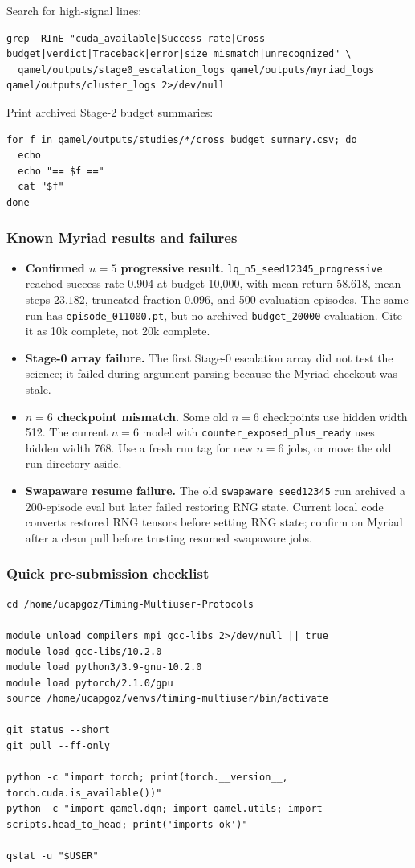 \documentclass[11pt]{article}
\newcommand{\code}[1]{\texttt{#1}}
\newcommand{\file}[1]{\texttt{\small #1}}
\begin{document}
Search for high-signal lines:
\begin{verbatim}
grep -RInE "cuda_available|Success rate|Cross-budget|verdict|Traceback|error|size mismatch|unrecognized" \
  qamel/outputs/stage0_escalation_logs qamel/outputs/myriad_logs qamel/outputs/cluster_logs 2>/dev/null
\end{verbatim}

Print archived Stage-2 budget summaries:
\begin{verbatim}
for f in qamel/outputs/studies/*/cross_budget_summary.csv; do
  echo
  echo "== $f =="
  cat "$f"
done
\end{verbatim}

\subsubsection*{Known Myriad results and failures}
\begin{itemize}
  \item \textbf{Confirmed $n=5$ progressive result.}
  \code{lq\_n5\_seed12345\_progressive} reached success rate $0.904$ at budget
  10{,}000, with mean return $58.618$, mean steps $23.182$, truncated fraction
  $0.096$, and 500 evaluation episodes. The same run has
  \file{episode\_011000.pt}, but no archived \file{budget\_20000} evaluation.
  Cite it as 10k complete, not 20k complete.
  \item \textbf{Stage-0 array failure.} The first Stage-0 escalation array did
  not test the science; it failed during argument parsing because the Myriad
  checkout was stale.
  \item \textbf{$n=6$ checkpoint mismatch.} Some old $n=6$ checkpoints use hidden
  width 512. The current $n=6$ model with \code{counter\_exposed\_plus\_ready}
  uses hidden width 768. Use a fresh run tag for new $n=6$ jobs, or move the old
  run directory aside.
  \item \textbf{Swapaware resume failure.} The old \code{swapaware\_seed12345}
  run archived a 200-episode eval but later failed restoring RNG state. Current
  local code converts restored RNG tensors before setting RNG state; confirm on
  Myriad after a clean pull before trusting resumed swapaware jobs.
\end{itemize}

\subsubsection*{Quick pre-submission checklist}
\begin{verbatim}
cd /home/ucapgoz/Timing-Multiuser-Protocols

module unload compilers mpi gcc-libs 2>/dev/null || true
module load gcc-libs/10.2.0
module load python3/3.9-gnu-10.2.0
module load pytorch/2.1.0/gpu
source /home/ucapgoz/venvs/timing-multiuser/bin/activate

git status --short
git pull --ff-only

python -c "import torch; print(torch.__version__, torch.cuda.is_available())"
python -c "import qamel.dqn; import qamel.utils; import scripts.head_to_head; print('imports ok')"

qstat -u "$USER"
\end{verbatim}
\end{document}

